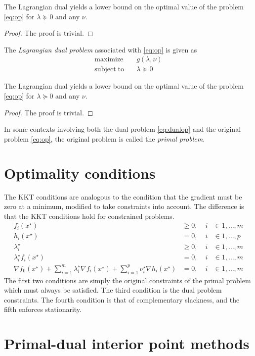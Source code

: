\begin{theorem}
  The Lagrangian dual yields a lower bound on the optimal value of the problem \eqref{eq:op} for $\lambda \succeq 0$ and any $\nu$.
\end{theorem}
\begin{proof}
  The proof is trivial.
\end{proof}

The \emph{Lagrangian dual problem} associated with \eqref{eq:op} is given as
\begin{align} \label{eq:dualop}
\mathrm{maximize}    \quad & g(\lambda, \nu) \nonumber \\
\mathrm{subject\;to} \quad & \lambda \succeq 0
\end{align}

\begin{theorem}
  The Lagrangian dual yields a lower bound on the optimal value of the problem \eqref{eq:op} for $\lambda \succeq 0$ and any $\nu$.
\end{theorem}
\begin{proof}
  The proof is trivial.
\end{proof}
In some contexts involving both the dual problem \eqref{eq:dualop} and the original problem \eqref{eq:op}, the original problem is called the \emph{primal problem}.

\section{Optimality conditions}
The KKT conditions are analogous to the condition that the gradient must be zero at a minimum, modified to take constraints into account. The difference is that the KKT conditions hold for constrained problems.
\begin{align} \label{eq:kkt}
 f_i(x^\star) & \geq 0, \; & i & \in {1,\dots,m} \nonumber \\
 h_i(x^\star) & = 0, \; & i & \in {1,\dots,p} \nonumber \\
 \lambda_i^\star & \geq 0, \; & i & \in {1,\dots,m} \\
 \lambda_i^\star f_i(x^\star) & = 0, \; & i & \in {1,\dots,m} \nonumber \\
 \nabla f_0(x^\star) + \sum_{i=1}^m \lambda_i^\star \nabla f_i(x^\star)
  + \sum_{i=1}^p \nu_i^\star \nabla h_i(x^\star) & = 0, \; & i & \in {1,\dots,m} \nonumber
\end{align}
The first two conditions are simply the original constraints of the primal problem which must always be satisfied. The third condition is the dual problem constraints. The fourth condition is that of complementary slackness, and the fifth enforces stationarity.

\section{Primal-dual interior point methods}